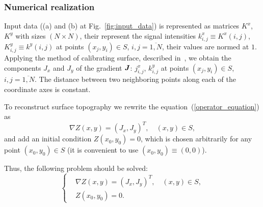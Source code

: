 \documentclass{beamer}
\begin{document}
\begin{frame}[allowframebreaks]
    \frametitle{Numerical realization}

    Input data ((a) and (b) at Fig.~\ref{fig:input_data}) is represented as matrices $K^x$, $K^y$
    with sizes $(N \times N)$, their represent the signal intensities $k^x_{i,j} \equiv K^x (i,j)$,
    $K^y_{i,j} \equiv k^y (i,j)$ at points $(x_j, y_i) \in S$, $i,j = \overline{1,N}$, their values
    are normed at $1$. Applying the method of calibrating surface, described in~\cite{main},
    we obtain the components $J_x$ and $J_y$ of the gradient ${\textbf{\emph{J}}}$: $j^x_{i,j}$,
    $k^y_{i,j}$ at points $(x_j, y_i) \in S$, $i,j = \overline{1,N}$.
    The distance between two neighboring points along each of the coordinate axes is constant.

    To reconstruct surface topography we rewrite the equation~(\ref{operator_equation}) as
    $$ \nabla Z(x,y) = (J_x, J_y)^T, \quad (x,y)\in S,$$
    and add an initial condition $Z(x_0,y_0) = 0$, which is chosen arbitrarily for any point
    $(x_0,y_0) \in S$ (it is convenient to use $(x_0,y_0) \equiv (0,0)$).

    \newpage

    Thus, the following problem should be solved:
    \begin{equation}
        \label{system_of_equations}
        \left\{
            \begin{aligned}
                &\nabla Z(x,y) = (J_x, J_y)^T, \quad (x,y)\in S, \\
                &Z(x_0,y_0) = 0.
            \end{aligned}
        \right.
    \end{equation}

    \newpage


\end{frame}
\end{document}
